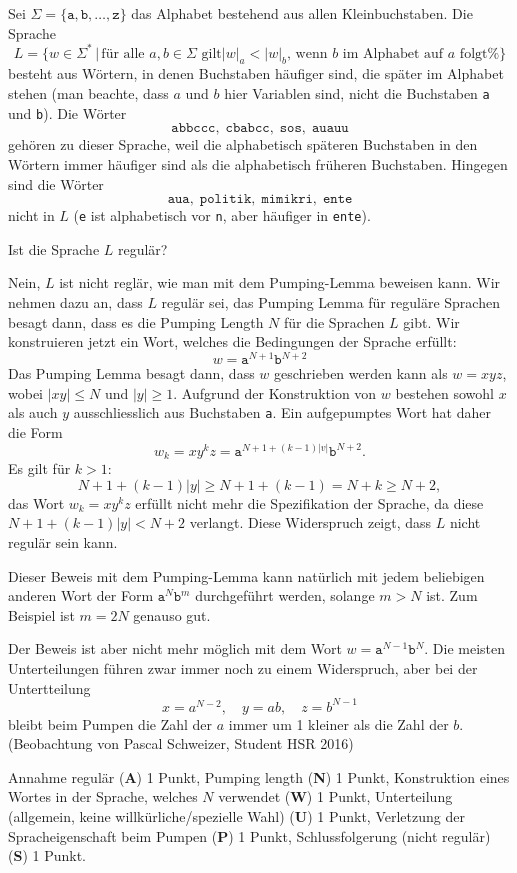 Sei $\Sigma=\{\texttt{a},\texttt{b},\dots,\texttt{z}\}$ das Alphabet
bestehend aus allen Kleinbuchstaben. Die Sprache
\[
L=\{ w\in\Sigma^*
\,
|\,
\text{
für alle $a,b\in\Sigma$ gilt
$|w|_a < |w|_b$, wenn $b$ im Alphabet auf $a$ folgt%
}
\}
\]
besteht aus Wörtern, in denen Buchstaben häufiger sind, die später im
Alphabet stehen (man beachte, dass $a$ und $b$ hier Variablen sind,
nicht die Buchstaben \texttt{a} und \texttt{b}).
Die Wörter
\[
\texttt{abbccc},\;
\texttt{cbabcc},\;
\texttt{sos},\;
\texttt{auauu}
\]
gehören zu dieser Sprache, weil die alphabetisch späteren Buchstaben
in den Wörtern immer häufiger sind als die alphabetisch
früheren Buchstaben. Hingegen sind die Wörter 
\[
\texttt{aua},\;
\texttt{politik},\;
\texttt{mimikri},\;
\texttt{ente}
\]
nicht in $L$ (\texttt{e} ist alphabetisch vor \texttt{n}, aber häufiger
in \texttt{ente}).

Ist die Sprache $L$ regulär?

\begin{loesung}
Nein, $L$ ist nicht reglär, wie man mit dem Pumping-Lemma beweisen kann.
Wir nehmen dazu an, dass $L$ regulär sei, das Pumping Lemma für
reguläre Sprachen besagt dann, dass es die Pumping Length $N$ für die
Sprachen $L$ gibt.
Wir konstruieren jetzt ein Wort, welches die Bedingungen der Sprache
erfüllt:
\[
w=\texttt{a}^{N+1}\texttt{b}^{N+2}
\]
Das Pumping Lemma besagt dann, dass $w$ geschrieben werden kann als
$w=xyz$, wobei $|xy|\le N$ und $|y|\ge 1$. 
Aufgrund der Konstruktion von $w$ bestehen sowohl $x$ als auch $y$
ausschliesslich aus Buchstaben \texttt{a}.
Ein aufgepumptes Wort hat daher die Form
\[
w_k=xy^kz = \texttt{a}^{N+1+(k-1)|v|}\texttt{b}^{N+2}.
\]
Es gilt für $k > 1$:
\[
N+1+(k-1)|y|\ge N+1+(k-1)=N+k\ge N+2,
\]
das Wort $w_k=xy^kz$ erfüllt nicht mehr die Spezifikation der Sprache,
da diese $N+1+(k-1)|y| < N+2$ verlangt.
Diese Widerspruch zeigt, dass $L$ nicht regulär sein kann.
\end{loesung}

\begin{diskussion}
Dieser Beweis mit dem Pumping-Lemma kann natürlich mit jedem beliebigen
anderen Wort der Form $\texttt{a}^N\texttt{b}^{m}$ durchgeführt werden,
solange $m > N$ ist. Zum Beispiel ist $m=2N$ genauso gut.

Der Beweis ist aber nicht mehr möglich mit dem Wort
$w=\texttt{a}^{N-1}\texttt{b}^N$.
Die meisten Unterteilungen führen zwar immer noch zu einem
Widerspruch, aber bei der Untertteilung
\[
x = a^{N-2}, \quad y=ab, \quad z= b^{N-1}
\]
bleibt beim Pumpen die Zahl der $a$ immer um 1 kleiner als
die Zahl der $b$.
(Beobachtung von Pascal Schweizer, Student HSR 2016)
\end{diskussion}

\begin{bewertung}
Annahme regulär ({\bf A}) 1 Punkt,
Pumping length ({\bf N}) 1 Punkt,
Konstruktion eines Wortes in der Sprache, welches $N$ verwendet ({\bf W})
1 Punkt,
Unterteilung (allgemein, keine willkürliche/spezielle Wahl) ({\bf U}) 1 Punkt,
Verletzung der Spracheigenschaft beim Pumpen ({\bf P}) 1 Punkt,
Schluss\-folgerung (nicht regulär) ({\bf S}) 1 Punkt.
\end{bewertung}
 
